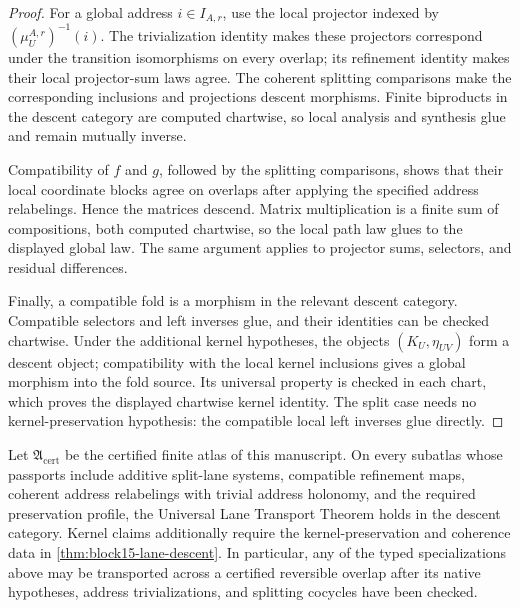 \begin{proof}
For a global address \(i\in I_{A,r}\), use the local projector indexed by
\((\mu_U^{A,r})^{-1}(i)\).  The trivialization identity makes these projectors
correspond under the transition isomorphisms on every overlap; its refinement
identity makes their local
projector-sum laws agree.  The coherent splitting comparisons make the
corresponding inclusions and projections descent morphisms.  Finite
biproducts in the descent category are computed chartwise, so local analysis
and synthesis glue and remain mutually inverse.

Compatibility of \(f\) and \(g\), followed by the splitting comparisons,
shows that their local coordinate blocks agree on overlaps after applying the
specified address relabelings.  Hence the matrices descend.  Matrix
multiplication is a finite sum of compositions, both computed chartwise, so
the local path law glues to the displayed global law.  The same argument
applies to projector sums, selectors, and residual differences.

Finally, a compatible fold is a morphism in the relevant descent category.
Compatible selectors and left inverses glue, and their identities can be
checked chartwise.  Under the additional kernel hypotheses, the objects
\((K_U,\eta_{UV})\) form a descent object; compatibility with the local kernel
inclusions gives a global morphism into the fold source.  Its universal
property is checked in each chart, which proves the displayed chartwise
kernel identity.  The split case needs no kernel-preservation hypothesis:
the compatible local left inverses glue directly.
\end{proof}

\begin{corollary}
\label{cor:block15-certified-atlas-lane-transport}
Let \(\mathfrak A_{\mathrm{cert}}\) be the certified finite atlas of this
manuscript.  On every subatlas whose passports include additive split-lane
systems, compatible refinement maps, coherent address relabelings with
trivial address holonomy, and the required preservation profile, the
Universal Lane Transport Theorem holds in the descent category.  Kernel
claims additionally require the kernel-preservation and coherence data in
\cref{thm:block15-lane-descent}.  In particular, any of the typed
specializations above may be transported across a certified reversible
overlap after its native hypotheses, address trivializations, and splitting
cocycles have been checked.
\end{corollary}


